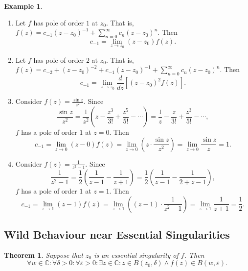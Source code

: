 \documentclass[12pt,openany]{book}
\newtheorem{theorem}{Theorem}[chapter]
\theoremstyle{definition}
\newtheorem{example}{Example}[section]
\newcommand{\C}{\mathbb{C}}
\newcommand{\of}[1]{\left( #1 \right)}
\begin{document}
	\vspace{4pt}
	\begin{example}
		\ \begin{enumerate}
			\item Let $f$ has pole of order $1$ at $z_0$. That is, $f(z)=c_{-1}(z-z_0)^{-1}+\sum_{n=0}^{\infty}c_n(z-z_0)^n$. Then \[
			c_{-1}=\lim\limits_{z\to z_0}(z-z_0)f(z).
			\]
			\item Let $f$ has pole of order $2$ at $z_0$. That is, $f(z)=c_{-2}+(z-z_0)^{-2}+c_{-1}(z-z_0)^{-1}+\sum_{n=0}^{\infty}c_n(z-z_0)^n$. Then \[
			c_{-1}=\lim\limits_{z\to z_0}\frac{d}{dz}\left[(z-z_0)^2f(z)\right].
			\]
			\item Consider $f(z)=\displaystyle\frac{\sin z}{z^2}$. Since \[
			\frac{\sin z}{z^2}=\frac{1}{z^2}\of{z-\frac{z^3}{3!}+\frac{z^5}{5!}-\cdots}=\frac{1}{z}-\frac{z}{3!}+\frac{z^3}{5!}-\cdots,
			\] $f$ has a pole of order $1$ at $z=0$. Then \[
			c_{-1}=\lim\limits_{z\to 0}(z-0)f(z)=\lim\limits_{z\to 0}\of{z\cdot\frac{\sin z}{z^2}}=\lim\limits_{z\to 0}\frac{\sin z}{z}=1.
			\]
			\item Consider $f(z)=\displaystyle\frac{1}{z^2-1}$. Since \[
			\frac{1}{z^2-1}=\frac{1}{2}\of{\frac{1}{z-1}-\frac{1}{z+1}}=\frac{1}{2}\of{\frac{1}{z-1}-\frac{1}{2+z-1}},
			\] $f$ has a pole of order $1$ at $z=1$. Then \[
			c_{-1}=\lim\limits_{z\to 1}(z-1)f(z)=\lim\limits_{z\to 1}\of{(z-1)\cdot\frac{1}{z^2-1}}=\lim\limits_{z\to 1}\frac{1}{z+1}=\frac{1}{2}.
			\]
		\end{enumerate}
	\end{example}
	
	
	\newpage
	\subsection{Wild Behaviour near Essential Singularities}
	\begin{tcolorbox}[colback=white,colframe=thmcolor,arc=5pt,title={\color{white}\bf Casorati-Weierstrass}]
		\begin{theorem}
			Suppose that $z_0$ is an essential singularity of $f$. Then \[
			\forall w\in\C:\forall\delta>0:\forall\varepsilon>0:\exists z\in\C:z\in B(z_0,\delta)\land f(z)\in B(w,\varepsilon).
			\]
		\end{theorem}
	\end{tcolorbox}
	
	\newpage
\end{document}
